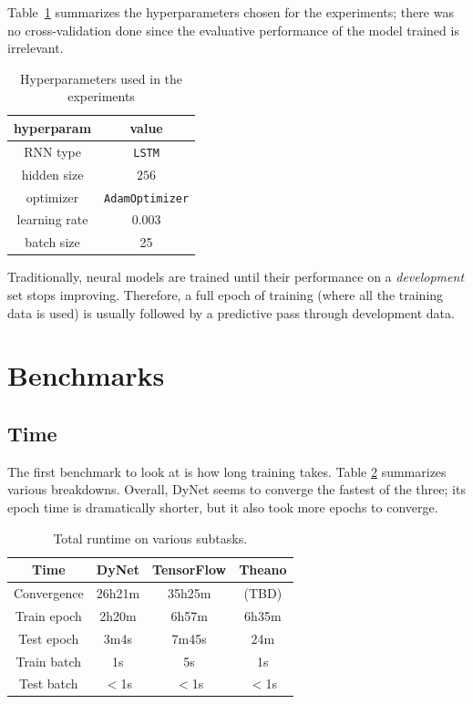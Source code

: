 \documentclass{article}
\begin{document}
Table~\ref{tab:hyperparams} summarizes the hyperparameters chosen for the experiments; there was no cross-validation done since the evaluative performance of the model trained is irrelevant.
\begin{table}\begin{center}
\begin{tabular}{cc}
\textbf{hyperparam} & \textbf{value} \\\hline
RNN type & \texttt{LSTM} \\
hidden size & $256$ \\
optimizer & \texttt{AdamOptimizer} \\
learning rate & $0.003$ \\
batch size & 25 \\
\end{tabular}
\caption{\label{tab:hyperparams}Hyperparameters used in the experiments}
\end{center}\end{table}

Traditionally, neural models are trained until their performance on a \textit{development} set stops improving. Therefore, a full epoch of training (where all the training data is used) is usually followed by a predictive pass through development data.
\section{Benchmarks}
\label{sec:benchmarks}
\subsection{Time}
The first benchmark to look at is how long training takes. Table \ref{tab:timing} summarizes various breakdowns. Overall, DyNet seems to converge the fastest of the three; its epoch time is dramatically shorter, but it also took more epochs to converge.

\begin{table}
\begin{tabular}{c|ccc}
Time					& DyNet 		& TensorFlow 	& Theano \\ \hline
Convergence		& 26h21m 		& 35h25m 			& (TBD)\\
Train epoch 		& 2h20m		& 6h57m 			& 6h35m \\
Test epoch 		& 3m4s			& 7m45s 			& 24m \\
Train batch 		& 1s 				& 5s 					& 1s \\
Test batch 			& $<$1s 		& $<$1s 			& $<$1s \\
\end{tabular}
\caption{\label{tab:timing}Total runtime on various subtasks.}
\end{table}
\end{document}
